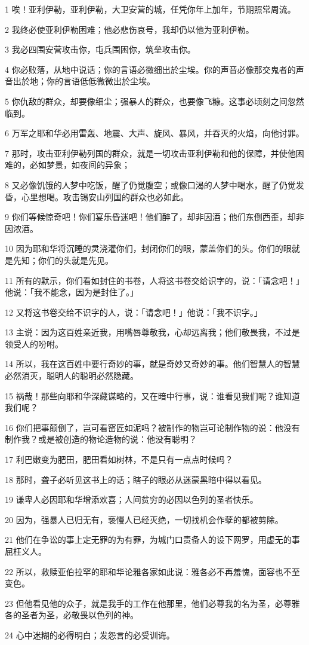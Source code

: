 \par 1 唉！亚利伊勒，亚利伊勒，大卫安营的城，任凭你年上加年，节期照常周流。
\par 2 我终必使亚利伊勒困难；他必悲伤哀号，我却仍以他为亚利伊勒。
\par 3 我必四围安营攻击你，屯兵围困你，筑垒攻击你。
\par 4 你必败落，从地中说话；你的言语必微细出於尘埃。你的声音必像那交鬼者的声音出於地；你的言语低低微微出於尘埃。
\par 5 你仇敌的群众，却要像细尘；强暴人的群众，也要像飞糠。这事必顷刻之间忽然临到。
\par 6 万军之耶和华必用雷轰、地震、大声、旋风、暴风，并吞灭的火焰，向他讨罪。
\par 7 那时，攻击亚利伊勒列国的群众，就是一切攻击亚利伊勒和他的保障，并使他困难的，必如梦景，如夜间的异象；
\par 8 又必像饥饿的人梦中吃饭，醒了仍觉腹空；或像口渴的人梦中喝水，醒了仍觉发昏，心里想喝。攻击锡安山列国的群众也必如此。
\par 9 你们等候惊奇吧！你们宴乐昏迷吧！他们醉了，却非因酒；他们东倒西歪，却非因浓酒。
\par 10 因为耶和华将沉睡的灵浇灌你们，封闭你们的眼，蒙盖你们的头。你们的眼就是先知；你们的头就是先见。
\par 11 所有的默示，你们看如封住的书卷，人将这书卷交给识字的，说：「请念吧！」他说：「我不能念，因为是封住了。」
\par 12 又将这书卷交给不识字的人，说：「请念吧！」他说：「我不识字。」
\par 13 主说：因为这百姓亲近我，用嘴唇尊敬我，心却远离我；他们敬畏我，不过是领受人的吩咐。
\par 14 所以，我在这百姓中要行奇妙的事，就是奇妙又奇妙的事。他们智慧人的智慧必然消灭，聪明人的聪明必然隐藏。
\par 15 祸哉！那些向耶和华深藏谋略的，又在暗中行事，说：谁看见我们呢？谁知道我们呢？
\par 16 你们把事颠倒了，岂可看窑匠如泥吗？被制作的物岂可论制作物的说：他没有制作我？或是被创造的物论造物的说：他没有聪明？
\par 17 利巴嫩变为肥田，肥田看如树林，不是只有一点点时候吗？
\par 18 那时，聋子必听见这书上的话；瞎子的眼必从迷蒙黑暗中得以看见。
\par 19 谦卑人必因耶和华增添欢喜；人间贫穷的必因以色列的圣者快乐。
\par 20 因为，强暴人已归无有，亵慢人已经灭绝，一切找机会作孽的都被剪除。
\par 21 他们在争讼的事上定无罪的为有罪，为城门口责备人的设下网罗，用虚无的事屈枉义人。
\par 22 所以，救赎亚伯拉罕的耶和华论雅各家如此说：雅各必不再羞愧，面容也不至变色。
\par 23 但他看见他的众子，就是我手的工作在他那里，他们必尊我的名为圣，必尊雅各的圣者为圣，必敬畏以色列的神。
\par 24 心中迷糊的必得明白；发怨言的必受训诲。


